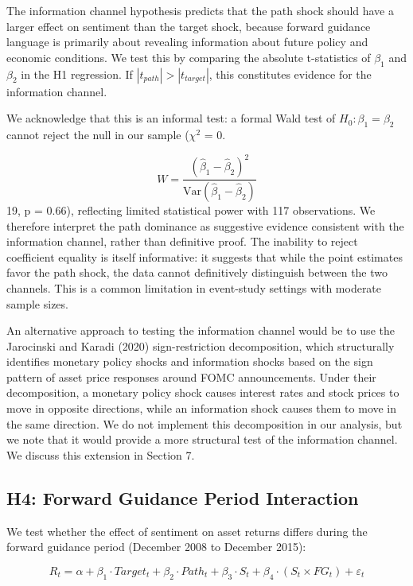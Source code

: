 \documentclass[12pt]{article}
\begin{document}
The information channel hypothesis predicts that the path shock should have a larger effect on sentiment than the target shock, because forward guidance language is primarily about revealing information about future policy and economic conditions. We test this by comparing the absolute t-statistics of $\beta_1$ and $\beta_2$ in the H1 regression. If $|t_{path}| > |t_{target}|$, this constitutes evidence for the information channel.

We acknowledge that this is an informal test: a formal Wald test of $H_0: \beta_1 = \beta_2$ cannot reject the null in our sample ($\chi^2$ = 0.

\begin{equation}
\label{eq:wald}
W = \frac{(\hat{\beta}_1 - \hat{\beta}_2)^2}{\text{Var}(\hat{\beta}_1 - \hat{\beta}_2)}
\end{equation}
19, p = 0.66), reflecting limited statistical power with 117 observations. We therefore interpret the path dominance as suggestive evidence consistent with the information channel, rather than definitive proof. The inability to reject coefficient equality is itself informative: it suggests that while the point estimates favor the path shock, the data cannot definitively distinguish between the two channels. This is a common limitation in event-study settings with moderate sample sizes.

An alternative approach to testing the information channel would be to use the Jarocinski and Karadi (2020) sign-restriction decomposition, which structurally identifies monetary policy shocks and information shocks based on the sign pattern of asset price responses around FOMC announcements. Under their decomposition, a monetary policy shock causes interest rates and stock prices to move in opposite directions, while an information shock causes them to move in the same direction. We do not implement this decomposition in our analysis, but we note that it would provide a more structural test of the information channel. We discuss this extension in Section 7.

\subsection{H4: Forward Guidance Period Interaction}

We test whether the effect of sentiment on asset returns differs during the forward guidance period (December 2008 to December 2015):

\begin{equation}
\label{eq:h3}
R_t = \alpha + \beta_1 \cdot Target_t + \beta_2 \cdot Path_t + \beta_3 \cdot S_t + \beta_4 \cdot (S_t \times FG_t) + \varepsilon_t
\end{equation}
\end{document}
